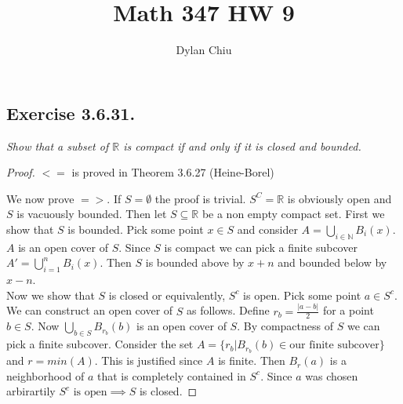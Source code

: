\documentclass[12pt, a4paper]{article}
\title{Math 347 HW 9}
\author{Dylan Chiu}
\newcommand{\mbr}{\mathbb{R}}
\newcommand{\mbn}{\mathbb{N}}
\begin{document}
\maketitle
\subsection*{Exercise 3.6.31.} 
    \textit{Show that a subset of $\mbr$ is compact if and only if it is
    closed and bounded.}
    \begin{proof}
        $<=$ is proved in Theorem 3.6.27 (Heine-Borel)

        We now prove $=>$. If $S = \emptyset$ the proof is trivial. $S^C = \mbr$ is obviously open and $S$ is vacuously bounded. 
        Then let $S \subseteq \mbr$ be a non empty compact set.
        First we show that $S$ is bounded. Pick some point $x\in S$ and consider
        $A = \bigcup_{i \in \mbn}{B_{i}(x)}$. $A$ is an open cover of $S$. 
        Since $S$ is compact we can pick a finite subcover $A'=\bigcup_{i = 1}^{n}{B_{i}(x)}$.
        Then $S$ is bounded above by $x+n$ and bounded below by $x-n$.\\ 
        Now we show that $S$ is closed or equivalently, $S^c$ is open. Pick some point $a\in S^c$. 
        We can construct an open cover of $S$ as follows. Define $r_b = \frac{|a-b|}{2}$ for a point $b\in S$. 
        Now $\bigcup_{b \in S}{B_{r_b}(b)}$ is an open cover of $S$. By compactness of $S$ we can pick a finite subcover. 
        Consider the set $A = \{r_b | B_{r_b}(b) \in \text{our finite subcover}\}$ and $r = min(A)$. This is justified since $A$ is finite. 
        Then $B_r(a)$ is a neighborhood of $a$ that is completely contained in $S^c$. Since $a$ was chosen arbirartily $S^c \text{ is open} \implies S$ is closed.
    \end{proof}
    \pagebreak
\end{document}
